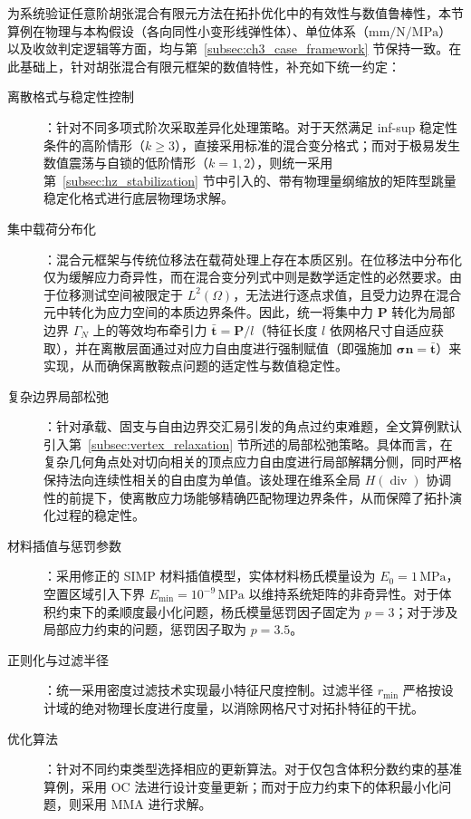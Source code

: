 为系统验证任意阶胡张混合有限元方法在拓扑优化中的有效性与数值鲁棒性，本节算例在物理与本构假设（各向同性小变形线弹性体）、单位体系（$\mathrm{mm}/\mathrm{N}/\mathrm{MPa}$）以及收敛判定逻辑等方面，均与第~\ref{subsec:ch3_case_framework} 节保持一致。在此基础上，针对胡张混合有限元框架的数值特性，补充如下统一约定：

\begin{description}
	\item[离散格式与稳定性控制]：针对不同多项式阶次采取差异化处理策略。对于天然满足 inf-sup 稳定性条件的高阶情形（$k \ge 3$），直接采用标准的混合变分格式；而对于极易发生数值震荡与自锁的低阶情形（$k=1, 2$），则统一采用第~\ref{subsec:hz_stabilization} 节中引入的、带有物理量纲缩放的矩阵型跳量稳定化格式进行底层物理场求解。
	
	\item[集中载荷分布化]：混合元框架与传统位移法在载荷处理上存在本质区别。在位移法中分布化仅为缓解应力奇异性，而在混合变分列式中则是数学适定性的必然要求。由于位移测试空间被限定于 $L^2(\Omega)$，无法进行逐点求值，且受力边界在混合元中转化为应力空间的本质边界条件。因此，统一将集中力 $\boldsymbol{P}$ 转化为局部边界 $\Gamma_N$ 上的等效均布牵引力 $\bar{\boldsymbol{t}} = \boldsymbol{P}/l$（特征长度 $l$ 依网格尺寸自适应获取），并在离散层面通过对应力自由度进行强制赋值（即强施加 $\boldsymbol{\sigma}\boldsymbol{n} = \bar{\boldsymbol{t}}$）来实现，从而确保离散鞍点问题的适定性与数值稳定性。
	
	\item[复杂边界局部松弛]：针对承载、固支与自由边界交汇易引发的角点过约束难题，全文算例默认引入第~\ref{subsec:vertex_relaxation} 节所述的局部松弛策略。具体而言，在复杂几何角点处对切向相关的顶点应力自由度进行局部解耦分侧，同时严格保持法向连续性相关的自由度为单值。该处理在维系全局 $H(\operatorname{div})$ 协调性的前提下，使离散应力场能够精确匹配物理边界条件，从而保障了拓扑演化过程的稳定性。
	
	\item[材料插值与惩罚参数]：采用修正的 SIMP 材料插值模型，实体材料杨氏模量设为 $E_0 = 1\,\mathrm{MPa}$，空置区域引入下界 $E_{\min} = 10^{-9}\,\mathrm{MPa}$ 以维持系统矩阵的非奇异性。对于体积约束下的柔顺度最小化问题，杨氏模量惩罚因子固定为 $p=3$；对于涉及局部应力约束的问题，惩罚因子取为 $p=3.5$。
	
	\item[正则化与过滤半径]：统一采用密度过滤技术实现最小特征尺度控制。过滤半径 $r_{\min}$ 严格按设计域的绝对物理长度进行度量，以消除网格尺寸对拓扑特征的干扰。
	
	\item[优化算法]：针对不同约束类型选择相应的更新算法。对于仅包含体积分数约束的基准算例，采用 OC 法进行设计变量更新；而对于应力约束下的体积最小化问题，则采用 MMA 进行求解。
\end{description}


